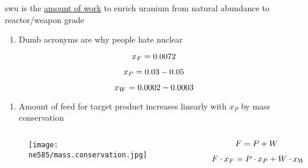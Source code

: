 \documentclass[aspectratio=1610,pdftex,dvipsnames,compress,xcolor={dvipsnames}]{beamer}
\newcommand{\acs}{\acrshort} %
\begin{document}
\addtocounter{framenumber}{-1} 
\begin{frame}{\acs{swu} is the \href{https://uidaho.pressbooks.pub/nuclearengineering/chapter/swu/}{amount of work} to enrich uranium from natural abundance to reactor/weapon grade}
    \begin{enumerate}[series=outerlist,topsep=0pt,itemsep=21pt,leftmargin=*,label=(\arabic*)]
        \item[]Dumb acronyms are why people hate nuclear
    \end{enumerate}

    \vspace*{\fill}

    \begin{equation}
        \LARGE
        x_F = 0.0072
    \end{equation}

    \begin{equation}
        \LARGE 
        x_P = 0.03 - 0.05
    \end{equation}

    \begin{equation}
        \LARGE 
        x_W = 0.0002 - 0.0003
    \end{equation}
    
    \vspace*{\fill}

    \begin{enumerate}[series=outerlist,topsep=0pt,itemsep=21pt,leftmargin=*,label=(\arabic*)]
        \item[]Amount of feed for target product increases linearly with $x_P$ by mass conservation
    \end{enumerate}
\end{frame}


\begin{frame}{}
    \begin{columns}[c]

        \begin{column}{0.55\textwidth}
            \begin{figure}
                \centering
                \texttt{[image: ne585/mass.conservation.jpg]}
            \end{figure}
        \end{column}

        \begin{column}{0.45\textwidth}
            \begin{equation}
                \LARGE 
                F = P + W
            \end{equation}

            \begin{equation}
                \LARGE 
                F \cdot x_F = P \cdot x_P + W \cdot x_W
            \end{equation}
        \end{column}

    \end{columns}
\end{frame}
\end{document}
